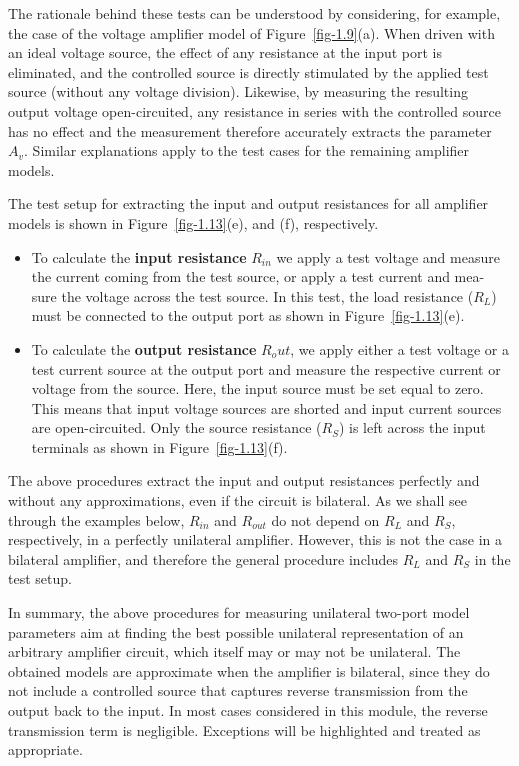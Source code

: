 \documentclass[
  11pt,
  letterpaper,
  abstract]{scrbook}
\begin{document}
The rationale behind these tests can be understood by considering, for
example, the case of the voltage amplifier model of
Figure~\ref{fig-1.9}(a). When driven with an ideal voltage source, the
effect of any resistance at the input port is eliminated, and the
controlled source is directly stimulated by the applied test source
(without any voltage division). Likewise, by measuring the resulting
output voltage open-circuited, any resistance in series with the
controlled source has no effect and the measurement therefore accurately
extracts the parameter \(A_v\). Similar explanations apply to the test
cases for the remaining amplifier models.

The test setup for extracting the input and output resistances for all
amplifier models is shown in Figure~\ref{fig-1.13}(e), and (f),
respectively.

\begin{itemize}
\item
  To calculate the \textbf{input resistance} \(R_{in}\) we apply a test
  voltage and measure the current coming from the test source, or apply
  a test current and mea- sure the voltage across the test source. In
  this test, the load resistance (\(R_L\)) must be connected to the
  output port as shown in Figure~\ref{fig-1.13}(e).
\item
  To calculate the \textbf{output resistance} \(R_out\), we apply either
  a test voltage or a test current source at the output port and measure
  the respective current or voltage from the source. Here, the input
  source must be set equal to zero. This means that input voltage
  sources are shorted and input current sources are open-circuited. Only
  the source resistance (\(R_S\)) is left across the input terminals as
  shown in Figure~\ref{fig-1.13}(f).
\end{itemize}

The above procedures extract the input and output resistances perfectly
and without any approximations, even if the circuit is bilateral. As we
shall see through the examples below, \(R_{in}\) and \(R_{out}\) do not
depend on \(R_L\) and \(R_S\), respectively, in a perfectly unilateral
amplifier. However, this is not the case in a bilateral amplifier, and
therefore the general procedure includes \(R_L\) and \(R_S\) in the test
setup.

In summary, the above procedures for measuring unilateral two-port model
parameters aim at finding the best possible unilateral representation of
an arbitrary amplifier circuit, which itself may or may not be
unilateral. The obtained models are approximate when the amplifier is
bilateral, since they do not include a controlled source that captures
reverse transmission from the output back to the input. In most cases
considered in this module, the reverse transmission term is negligible.
Exceptions will be highlighted and treated as appropriate.
\end{document}
